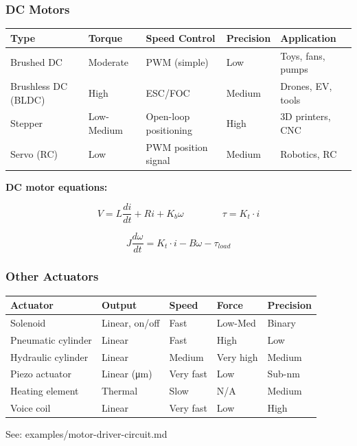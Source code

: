 \documentclass[11pt,a4paper]{book}
\begin{document}
\subsubsection{DC Motors}

\begin{center}
\begin{tabular}{|l|l|l|l|l|}
\hline
Type & Torque & Speed Control & Precision & Application \\
\hline
Brushed DC & Moderate & PWM (simple) & Low & Toys, fans, pumps \\
Brushless DC (BLDC) & High & ESC/FOC & Medium & Drones, EV, tools \\
Stepper & Low-Medium & Open-loop positioning & High & 3D printers, CNC \\
Servo (RC) & Low & PWM position signal & Medium & Robotics, RC \\
\hline
\end{tabular}
\end{center}

\textbf{DC motor equations:}

\[V = L\frac{di}{dt} + Ri + K_b\omega \qquad \qquad \tau = K_t \cdot i\]

\[J\frac{d\omega}{dt} = K_t \cdot i - B\omega - \tau_{load}\]

\subsubsection{Other Actuators}

\begin{center}
\begin{tabular}{|l|l|l|l|l|}
\hline
Actuator & Output & Speed & Force & Precision \\
\hline
Solenoid & Linear, on/off & Fast & Low-Med & Binary \\
Pneumatic cylinder & Linear & Fast & High & Low \\
Hydraulic cylinder & Linear & Medium & Very high & Medium \\
Piezo actuator & Linear (μm) & Very fast & Low & Sub-nm \\
Heating element & Thermal & Slow & N/A & Medium \\
Voice coil & Linear & Very fast & Low & High \\
\hline
\end{tabular}
\end{center}

See: examples/motor-driver-circuit.md
\end{document}
